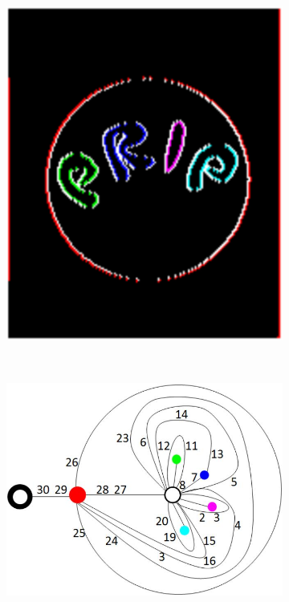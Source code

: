 \documentclass[12pt]{article}
\begin{document}
\begin{figure}[tb]
\begin{subfigure}[b]{0.25\textwidth}
        \includegraphics[width=\textwidth]{img/prip2}
        \caption{}\label{fig:prip2}
    \end{subfigure}~%
    \begin{subfigure}[b]{0.4\textwidth}
        \includegraphics[width=\textwidth]{img/prip3}
        \caption{}\label{fig:prip3}
    \end{subfigure}


\end{figure}
\end{document}

